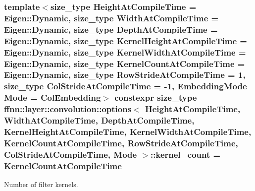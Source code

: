 \hypertarget{structffnn_1_1layer_1_1convolution_1_1options_a171b201743a4d63fac53b414980b24ea}{
\subsubsection[{kernel\-\_\-count}]{\setlength{\rightskip}{0pt plus 5cm}template$<$size\-\_\-type Height\-At\-Compile\-Time = Eigen\-::\-Dynamic, size\-\_\-type Width\-At\-Compile\-Time = Eigen\-::\-Dynamic, size\-\_\-type Depth\-At\-Compile\-Time = Eigen\-::\-Dynamic, size\-\_\-type Kernel\-Height\-At\-Compile\-Time = Eigen\-::\-Dynamic, size\-\_\-type Kernel\-Width\-At\-Compile\-Time = Eigen\-::\-Dynamic, size\-\_\-type Kernel\-Count\-At\-Compile\-Time = Eigen\-::\-Dynamic, size\-\_\-type Row\-Stride\-At\-Compile\-Time = 1, size\-\_\-type Col\-Stride\-At\-Compile\-Time = -\/1, Embedding\-Mode Mode = Col\-Embedding$>$ constexpr {\bf size\-\_\-type} {\bf ffnn\-::layer\-::convolution\-::options}$<$ Height\-At\-Compile\-Time, Width\-At\-Compile\-Time, Depth\-At\-Compile\-Time, Kernel\-Height\-At\-Compile\-Time, Kernel\-Width\-At\-Compile\-Time, Kernel\-Count\-At\-Compile\-Time, Row\-Stride\-At\-Compile\-Time, Col\-Stride\-At\-Compile\-Time, Mode $>$\-::kernel\-\_\-count = Kernel\-Count\-At\-Compile\-Time\hspace{0.3cm}{\ttfamily [static]}}}\label{structffnn_1_1layer_1_1convolution_1_1options_a171b201743a4d63fac53b414980b24ea}


Number of filter kernels. 

